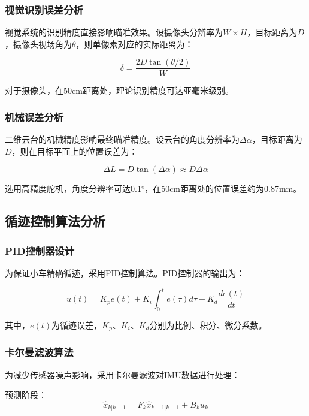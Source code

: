 \documentclass[12pt,a4paper]{ctexart}
\begin{document}
\subsubsection{\textbf{视觉识别误差分析}}
视觉系统的识别精度直接影响瞄准效果。设摄像头分辨率为$W \times H$，目标距离为$D$，摄像头视场角为$\theta$，则单像素对应的实际距离为：

\begin{equation}
\delta = \frac{2D \tan(\theta/2)}{W}
\end{equation}

对于摄像头，在50cm距离处，理论识别精度可达亚毫米级别。

\subsubsection{\textbf{机械误差分析}}
二维云台的机械精度影响最终瞄准精度。设云台的角度分辨率为$\Delta\alpha$，目标距离为$D$，则在目标平面上的位置误差为：

\begin{equation}
\Delta L = D \tan(\Delta\alpha) \approx D \Delta\alpha
\end{equation}

选用高精度舵机，角度分辨率可达0.1°，在50cm距离处的位置误差约为0.87mm。

\subsection{\textbf{循迹控制算法分析}}

\subsubsection{\textbf{PID控制器设计}}
为保证小车精确循迹，采用PID控制算法。PID控制器的输出为：

\begin{equation}
u(t) = K_p e(t) + K_i \int_0^t e(\tau)d\tau + K_d \frac{de(t)}{dt}
\end{equation}

其中，$e(t)$为循迹误差，$K_p$、$K_i$、$K_d$分别为比例、积分、微分系数。

\subsubsection{\textbf{卡尔曼滤波算法}}
为减少传感器噪声影响，采用卡尔曼滤波对IMU数据进行处理：

预测阶段：
\begin{equation}
\hat{x}_{k|k-1} = F_k \hat{x}_{k-1|k-1} + B_k u_k
\end{equation}
\end{document}
